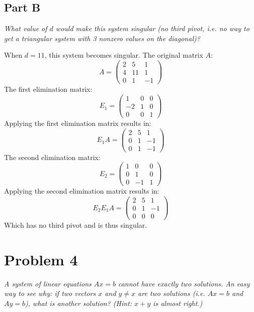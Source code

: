 \documentclass{article}
\begin{document}
\subsection*{Part B}

\textit{What value of $ d $ would make this system singular (no third pivot,
i.e. no way to get a triangular system with 3 nonzero values on the diagonal)?}

\bigbreak

When $ d = 11 $, this system becomes singular. The original matrix $ A $:
\[
    A = \begin{pmatrix}
        2 & 5 & 1 \\
        4 & 11 & 1 \\
        0 & 1 & -1
    \end{pmatrix}
\]
The first elimination matrix:
\[
    E_1 = \begin{pmatrix}
        1 & 0 & 0 \\
        -2 & 1 & 0 \\
        0 & 0 & 1
    \end{pmatrix}
\]
Applying the first elimination matrix results in:
\[
    E_1 A = \begin{pmatrix}
        2 & 5 & 1 \\
        0 & 1 & -1 \\
        0 & 1 & -1
    \end{pmatrix}
\]
The second elimination matrix:
\[
    E_2 = \begin{pmatrix}
        1 & 0 & 0 \\
        0 & 1 & 0 \\
        0 & -1 & 1
    \end{pmatrix}
\]
Applying the second elimination matrix results in:
\[
    E_2 E_1 A = \begin{pmatrix}
        2 & 5 & 1 \\
        0 & 1 & -1 \\
        0 & 0 & 0
    \end{pmatrix}
\]
Which has no third pivot and is thus singular.

\section*{Problem 4}

\textit{A system of linear equations $ Ax = b $ cannot have exactly two
solutions. An easy way to see why: if two vectors $ x $ and $ y \neq x $ are two
solutions (i.e. $ Ax = b $ and $ Ay = b $), what is another solution? (Hint: $ x
+ y $ is almost right.)}
\end{document}
